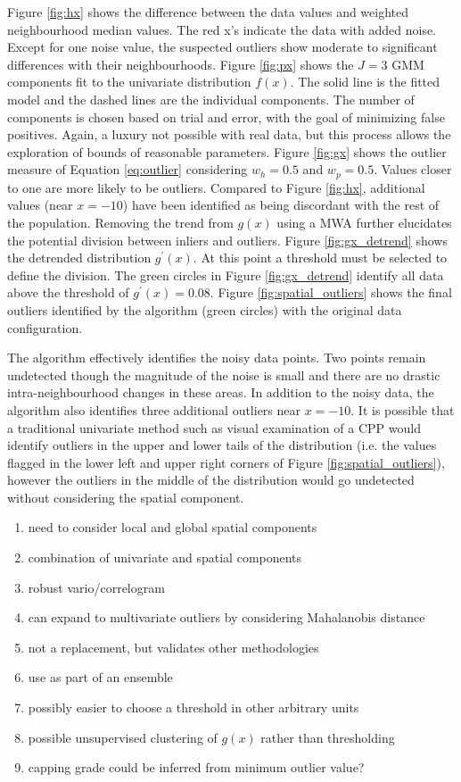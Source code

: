 Figure \ref{fig:hx} shows the difference between the data values and weighted neighbourhood median values. The red x's indicate the data with added noise. Except for one noise value, the suspected outliers show moderate to significant differences with their neighbourhoods. Figure \ref{fig:px} shows the $J=3$ \gls{GMM} components fit to the univariate distribution $f(x)$. The solid line is the fitted model and the dashed lines are the individual components. The number of components is chosen based on trial and error, with the goal of minimizing false positives. Again, a luxury not possible with real data, but this process allows the exploration of bounds of reasonable parameters. Figure \ref{fig:gx} shows the outlier measure of Equation \ref{eq:outlier} considering $w_{h}=0.5$ and $w_{p}=0.5$. Values closer to one are more likely to be outliers. Compared to Figure \ref{fig:hx}, additional values (near $x=-10$) have been identified as being discordant with the rest of the population. Removing the trend from $g(x)$ using a \gls{MWA} further elucidates the potential division between inliers and outliers. Figure \ref{fig:gx_detrend} shows the detrended distribution $g^{\prime}(x)$. At this point a threshold must be selected to define the division. The green circles in Figure \ref{fig:gx_detrend} identify all data above the threshold of $g^{\prime}(x)=0.08$. Figure \ref{fig:spatial_outliers} shows the final outliers identified by the algorithm (green circles) with the original data configuration.

The algorithm effectively identifies the noisy data points. Two points remain undetected though the magnitude of the noise is small and there are no drastic intra-neighbourhood changes in these areas. In addition to the noisy data, the algorithm also identifies three additional outliers near $x=-10$. It is possible that a traditional univariate method such as visual examination of a \gls{CPP} would identify outliers in the upper and lower tails of the distribution (i.e. the values flagged in the lower left and upper right corners of Figure \ref{fig:spatial_outliers}), however the outliers in the middle of the distribution would go undetected without considering the spatial component.


\begin{enumerate}
    \item need to consider local and global spatial components
    \item combination of univariate and spatial components
    \item robust vario/correlogram \cite{drumond2019using}
    \item can expand to multivariate outliers by considering Mahalanobis distance
    \item not a replacement, but validates other methodologies
    \item use as part of an ensemble
    \item possibly easier to choose a threshold in other arbitrary units
    \item possible unsupervised clustering of $g(x)$ rather than thresholding
    \item capping grade could be inferred from minimum outlier value?
\end{enumerate}


